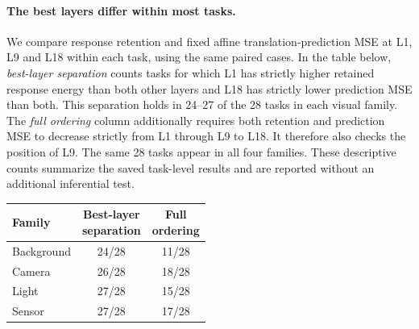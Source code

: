 \paragraph{The best layers differ within most tasks.}
We compare response retention and fixed affine translation-prediction MSE at L1, L9 and L18 within each task, using the same paired cases. In the table below, \emph{best-layer separation} counts tasks for which L1 has strictly higher retained response energy than both other layers and L18 has strictly lower prediction MSE than both. This separation holds in 24--27 of the 28 tasks in each visual family. The \emph{full ordering} column additionally requires both retention and prediction MSE to decrease strictly from L1 through L9 to L18. It therefore also checks the position of L9. The same 28 tasks appear in all four families. These descriptive counts summarize the saved task-level results and are reported without an additional inferential test.

\begin{center}
\small
\setlength{\tabcolsep}{4pt}
\begin{tabular}{lcc}
\toprule
Family & \shortstack{Best-layer\\separation} & \shortstack{Full\\ordering}\\
\midrule
Background & 24/28 & 11/28\\
Camera & 26/28 & 18/28\\
Light & 27/28 & 15/28\\
Sensor & 27/28 & 17/28\\
\bottomrule
\end{tabular}
\end{center}
